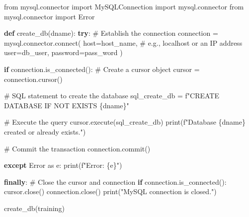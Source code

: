\documentclass[
  letterpaper,
  DIV=11,
  numbers=noendperiod]{scrreprt}
\newenvironment{Shaded}{\begin{snugshade}}{\end{snugshade}}
\newcommand{\BuiltInTok}[1]{\textcolor[rgb]{0.00,0.23,0.31}{#1}}
\newcommand{\CommentTok}[1]{\textcolor[rgb]{0.37,0.37,0.37}{#1}}
\newcommand{\ControlFlowTok}[1]{\textcolor[rgb]{0.00,0.23,0.31}{\textbf{#1}}}
\newcommand{\ExtensionTok}[1]{\textcolor[rgb]{0.00,0.23,0.31}{#1}}
\newcommand{\ImportTok}[1]{\textcolor[rgb]{0.00,0.46,0.62}{#1}}
\newcommand{\KeywordTok}[1]{\textcolor[rgb]{0.00,0.23,0.31}{\textbf{#1}}}
\newcommand{\NormalTok}[1]{\textcolor[rgb]{0.00,0.23,0.31}{#1}}
\newcommand{\OperatorTok}[1]{\textcolor[rgb]{0.37,0.37,0.37}{#1}}
\newcommand{\SpecialCharTok}[1]{\textcolor[rgb]{0.37,0.37,0.37}{#1}}
\newcommand{\SpecialStringTok}[1]{\textcolor[rgb]{0.13,0.47,0.30}{#1}}
\newcommand{\StringTok}[1]{\textcolor[rgb]{0.13,0.47,0.30}{#1}}
\begin{document}
\begin{Shaded}
\begin{Highlighting}[]
\ImportTok{from}\NormalTok{ mysql.connector }\ImportTok{import}\NormalTok{ MySQLConnection}
\ImportTok{import}\NormalTok{ mysql.connector}
\ImportTok{from}\NormalTok{ mysql.connector }\ImportTok{import}\NormalTok{ Error}

\KeywordTok{def}\NormalTok{ create\_db(dname):}
    \ControlFlowTok{try}\NormalTok{:}
        \CommentTok{\# Establish the connection}
\NormalTok{        connection }\OperatorTok{=}\NormalTok{ mysql.connector.}\ExtensionTok{connect}\NormalTok{(}
\NormalTok{            host}\OperatorTok{=}\NormalTok{host\_name,  }\CommentTok{\# e.g., \textquotesingle{}localhost\textquotesingle{} or an IP address}
\NormalTok{            user}\OperatorTok{=}\NormalTok{db\_user,}
\NormalTok{            password}\OperatorTok{=}\NormalTok{pass\_word}
\NormalTok{        )}

        \ControlFlowTok{if}\NormalTok{ connection.is\_connected():}
            \CommentTok{\# Create a cursor object}
\NormalTok{            cursor }\OperatorTok{=}\NormalTok{ connection.cursor()}

            \CommentTok{\# SQL statement to create the database}
\NormalTok{            sql\_create\_db }\OperatorTok{=} \SpecialStringTok{f"CREATE DATABASE IF NOT EXISTS }\SpecialCharTok{\{}\NormalTok{dname}\SpecialCharTok{\}}\SpecialStringTok{"}

            \CommentTok{\# Execute the query}
\NormalTok{            cursor.execute(sql\_create\_db)}
            \BuiltInTok{print}\NormalTok{(}\SpecialStringTok{f"Database \textquotesingle{}}\SpecialCharTok{\{}\NormalTok{dname}\SpecialCharTok{\}}\SpecialStringTok{\textquotesingle{} created or already exists."}\NormalTok{)}

            \CommentTok{\# Commit the transaction}
\NormalTok{            connection.commit()}
    
    \ControlFlowTok{except}\NormalTok{ Error }\ImportTok{as}\NormalTok{ e:}
        \BuiltInTok{print}\NormalTok{(}\SpecialStringTok{f"Error: }\SpecialCharTok{\{}\NormalTok{e}\SpecialCharTok{\}}\SpecialStringTok{"}\NormalTok{)}
    
    \ControlFlowTok{finally}\NormalTok{:}
        \CommentTok{\# Close the cursor and connection}
        \ControlFlowTok{if}\NormalTok{ connection.is\_connected():}
\NormalTok{            cursor.close()}
\NormalTok{            connection.close()}
            \BuiltInTok{print}\NormalTok{(}\StringTok{"MySQL connection is closed."}\NormalTok{)}
            
\NormalTok{create\_db(}\StringTok{\textquotesingle{}training\textquotesingle{}}\NormalTok{)}
\end{Highlighting}
\end{Shaded}
\end{document}
